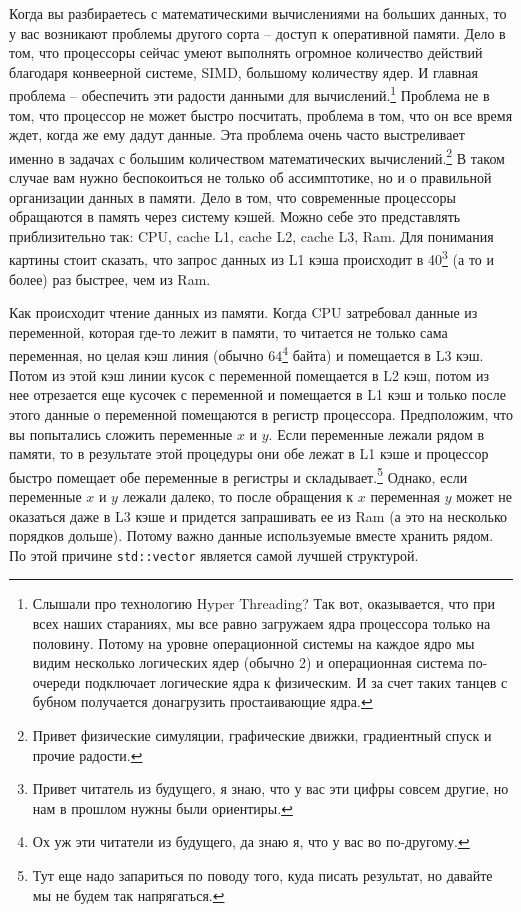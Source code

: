 \documentclass{article}
\begin{document}
Когда вы разбираетесь с математическими вычислениями на больших данных, то у вас возникают проблемы другого сорта -- доступ к оперативной памяти. Дело в том, что процессоры сейчас умеют выполнять огромное количество действий благодаря конвеерной системе, SIMD, большому количеству ядер. И главная проблема -- обеспечить эти радости данными для вычислений.\footnote{Слышали про технологию Hyper Threading? Так вот, оказывается, что при всех наших стараниях, мы все равно загружаем ядра процессора только на половину. Потому на уровне операционной системы на каждое ядро мы видим несколько логических ядер (обычно 2) и операционная система по-очереди подключает логические ядра к физическим. И за счет таких танцев с бубном получается донагрузить простаивающие ядра.} Проблема не в том, что процессор не может быстро посчитать, проблема в том, что он все время ждет, когда же ему дадут данные. Эта проблема очень часто выстреливает именно в задачах с большим количеством математических вычислений.\footnote{Привет физические симуляции, графические движки, градиентный спуск и прочие радости.} В таком случае вам нужно беспокоиться не только об ассимптотике, но и о правильной организации данных в памяти. Дело в том, что современные процессоры обращаются в память через систему кэшей. Можно себе это представлять приблизительно так: CPU, cache L1, cache L2, cache L3, Ram. Для понимания картины стоит сказать, что запрос данных из L1 кэша происходит в 40\footnote{Привет читатель из будущего, я знаю, что у вас эти цифры совсем другие, но нам в прошлом нужны были ориентиры.} (а то и более) раз быстрее, чем из Ram. 

Как происходит чтение данных из памяти. Когда CPU затребовал данные из переменной, которая где-то лежит в памяти, то читается не только сама переменная, но целая кэш линия (обычно $64$\footnote{Ох уж эти читатели из будущего, да знаю я, что у вас во по-другому.} байта) и помещается в L3 кэш. Потом из этой кэш линии кусок с переменной помещается в L2 кэш, потом из нее отрезается еще кусочек с переменной и помещается в L1 кэш и только после этого данные о переменной помещаются в регистр процессора. Предположим, что вы попытались сложить переменные $x$ и $y$. Если переменные лежали рядом в памяти, то в результате этой процедуры они обе лежат в L1 кэше и процессор быстро помещает обе переменные в регистры и складывает.\footnote{Тут еще надо запариться по поводу того, куда писать результат, но давайте мы не будем так напрягаться.} Однако, если переменные $x$ и $y$ лежали далеко, то после обращения к $x$ переменная $y$ может не оказаться даже в L3 кэше и придется запрашивать ее из Ram (а это на несколько порядков дольше). Потому важно данные используемые вместе хранить рядом. По этой причине \verb"std::vector" является самой лучшей структурой.
\end{document}

